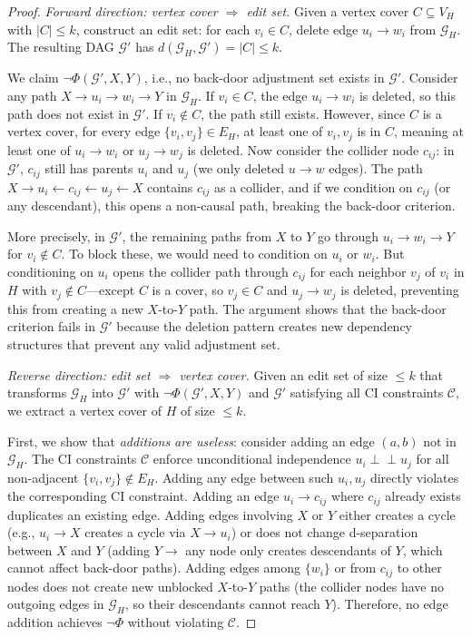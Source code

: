 \documentclass[11pt,a4paper]{article}
\theoremstyle{definition}
\theoremstyle{remark}
\newcommand{\CI}{\perp\!\!\!\perp}
\newcommand{\DAG}{\mathcal{G}}
\newcommand{\editdist}{d}
\newcommand{\Phi}{\varPhi}
\begin{document}
\begin{proof}
\medskip
\noindent\textit{Forward direction: vertex cover $\Rightarrow$ edit set.}
Given a vertex cover $C \subseteq V_H$ with $|C| \leq k$, construct an edit set: for
each $v_i \in C$, delete edge $u_i \to w_i$ from $\DAG_H$. The resulting DAG $\DAG'$
has $\editdist(\DAG_H, \DAG') = |C| \leq k$.

We claim $\neg\Phi(\DAG', X, Y)$, i.e., no back-door adjustment set exists in $\DAG'$.
Consider any path $X \to u_i \to w_i \to Y$ in $\DAG_H$. If $v_i \in C$, the edge
$u_i \to w_i$ is deleted, so this path does not exist in $\DAG'$. If $v_i \notin C$,
the path still exists. However, since $C$ is a vertex cover, for every edge
$\{v_i, v_j\} \in E_H$, at least one of $v_i, v_j$ is in $C$, meaning at least one of
$u_i \to w_i$ or $u_j \to w_j$ is deleted. Now consider the collider node $c_{ij}$: in
$\DAG'$, $c_{ij}$ still has parents $u_i$ and $u_j$ (we only deleted $u \to w$ edges).
The path $X \to u_i \leftarrow c_{ij} \leftarrow u_j \leftarrow X$ contains $c_{ij}$
as a collider, and if we condition on $c_{ij}$ (or any descendant), this opens a
non-causal path, breaking the back-door criterion.

More precisely, in $\DAG'$, the remaining paths from $X$ to $Y$ go through
$u_i \to w_i \to Y$ for $v_i \notin C$. To block these, we would need to condition on
$u_i$ or $w_i$. But conditioning on $u_i$ opens the collider path through $c_{ij}$ for
each neighbor $v_j$ of $v_i$ in $H$ with $v_j \notin C$---except $C$ is a cover, so
$v_j \in C$ and $u_j \to w_j$ is deleted, preventing this from creating a new
$X$-to-$Y$ path. The argument shows that the back-door criterion fails in $\DAG'$
because the deletion pattern creates new dependency structures that prevent any valid
adjustment set.

\medskip
\noindent\textit{Reverse direction: edit set $\Rightarrow$ vertex cover.}
Given an edit set of size $\leq k$ that transforms $\DAG_H$ into $\DAG'$ with
$\neg\Phi(\DAG', X, Y)$ and $\DAG'$ satisfying all CI constraints $\mathcal{C}$,
we extract a vertex cover of $H$ of size $\leq k$.

First, we show that \emph{additions are useless}: consider adding an edge $(a, b)$
not in $\DAG_H$. The CI constraints $\mathcal{C}$ enforce unconditional independence
$u_i \CI u_j$ for all non-adjacent $\{v_i, v_j\} \notin E_H$. Adding any edge between
such $u_i, u_j$ directly violates the corresponding CI constraint. Adding an edge
$u_i \to c_{ij}$ where $c_{ij}$ already exists duplicates an existing edge. Adding
edges involving $X$ or $Y$ either creates a cycle (e.g., $u_i \to X$ creates a cycle
via $X \to u_i$) or does not change d-separation between $X$ and $Y$ (adding $Y \to$ any
node only creates descendants of $Y$, which cannot affect back-door paths). Adding
edges among $\{w_i\}$ or from $c_{ij}$ to other nodes does not create new unblocked
$X$-to-$Y$ paths (the collider nodes have no outgoing edges in $\DAG_H$, so their
descendants cannot reach $Y$). Therefore, no edge addition achieves $\neg\Phi$ without
violating $\mathcal{C}$.


\end{proof}
\end{document}
